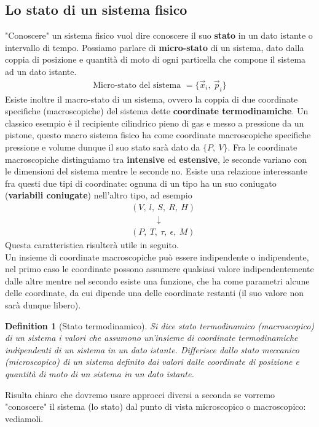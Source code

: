 \documentclass[10pt,a4paper]{article}
\newtheorem{definition}{Definition}
\begin{document}
	\subsection{Lo stato di un sistema fisico}
		"Conoscere" un sistema fisico vuol dire conoscere il suo \textbf{stato} in un dato istante o intervallo di tempo.
		Possiamo parlare di \textbf{micro-stato} di un sistema, dato dalla coppia di posizione e quantità di moto di ogni particella che compone il sistema ad un dato istante. 
		\begin{align*}
			\text{Micro-stato del sistema } = \{ \vec{x}_i,\ \vec{p}_i\}
		\end{align*}
		Esiste inoltre il macro-stato di un sistema, ovvero la coppia di due coordinate specifiche (macroscopiche) del sistema dette \textbf{coordinate termodinamiche}. Un classico esempio è il recipiente cilindrico pieno di gas e messo a pressione da un pistone, questo macro sistema fisico ha come coordinate macroscopiche specifiche pressione e volume dunque il suo stato sarà dato da $\{P,\ V\}$. Fra le coordinate macroscopiche distinguiamo tra \textbf{intensive} ed \textbf{estensive}, le seconde variano con le dimensioni del sistema mentre le seconde no. Esiste una relazione interessante fra questi due tipi di coordinate: ognuna di un tipo ha un suo coniugato (\textbf{variabili coniugate}) nell'altro tipo, ad esempio 
		\begin{align*}
			&(V,\ l ,\ S,\ R,\ H)\\
			&\quad \quad \quad \downarrow\\
			&(P,\ T,\ \tau,\ \epsilon,\ M)
		\end{align*}
		Questa caratteristica risulterà utile in seguito.\\
		Un insieme di coordinate macroscopiche può essere indipendente o indipendente, nel primo caso le coordinate possono assumere qualsiasi valore indipendentemente dalle altre mentre nel secondo esiste una funzione, che ha come parametri alcune delle coordinate, da cui dipende una delle coordinate restanti (il suo valore non sarà dunque libero). 
		\begin{definition}[Stato termodinamico]
			Si dice stato termodinamico (macroscopico) di un sistema i valori che assumono un'insieme di coordinate termodinamiche indipendenti di un sistema in un dato istante. Differisce dallo stato meccanico (microscopico) di un sistema definito dai valori dalle coordinate di posizione e quantità di moto di un sistema in un dato istante. 
		\end{definition}
		Risulta chiaro che dovremo usare approcci diversi a seconda se vorremo "conoscere" il sistema (lo stato) dal punto di vista microscopico o macroscopico: vediamoli. 
\end{document}
